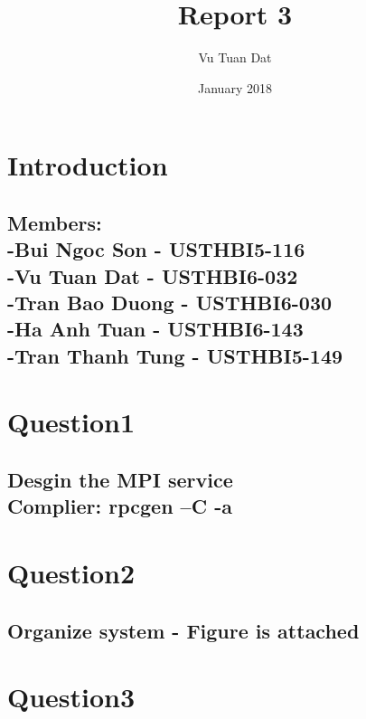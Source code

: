 \documentclass{article}
\title{Report 3}
\author{Vu Tuan Dat }
\date{January 2018}
\begin{document}
\maketitle

\section{Introduction}

\subsection{Members:\\-Bui Ngoc Son - USTHBI5-116\\-Vu Tuan Dat - USTHBI6-032\\-Tran Bao Duong - USTHBI6-030\\-Ha Anh Tuan - USTHBI6-143\\-Tran Thanh Tung - USTHBI5-149}
\section{Question1}
\subsection{ Desgin the MPI service\\

Complier: rpcgen –C -a  }
\section{Question2}
\subsection{
Organize system
 - Figure is attached}
 
 
 \section{Question3}
\end{document}
